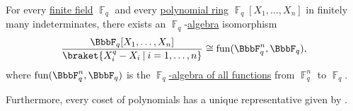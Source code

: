 \begin{proposition}\label{thm:functions_over_prime_fields}
  For every \hyperref[thm:finite_fields]{finite field} \( \BbbF_q \) and every \hyperref[def:polynomial_algebra]{polynomial ring} \( \BbbF_q[X_1, \ldots, X_n] \) in finitely many indeterminates, there exists an \( \BbbF_q \)-\hyperref[def:algebra_over_ring]{algebra} isomorphism
  \begin{equation*}
    \frac {\BbbF_q[X_1, \ldots, X_n]} {\braket{ X_i^q - X_i \given i = 1, \ldots, n }} \cong \fun(\BbbF_q^n, \BbbF_q),
  \end{equation*}
  where \( \fun(\BbbF_q^n, \BbbF_q) \) is the \hyperref[thm:functions_over_algebra]{\( \BbbF_q \)-algebra of all functions} from \( \BbbF
  _q^n \) to \( \BbbF_q \).

  Furthermore, every coset of polynomials has a unique representative given by .
\end{proposition}
